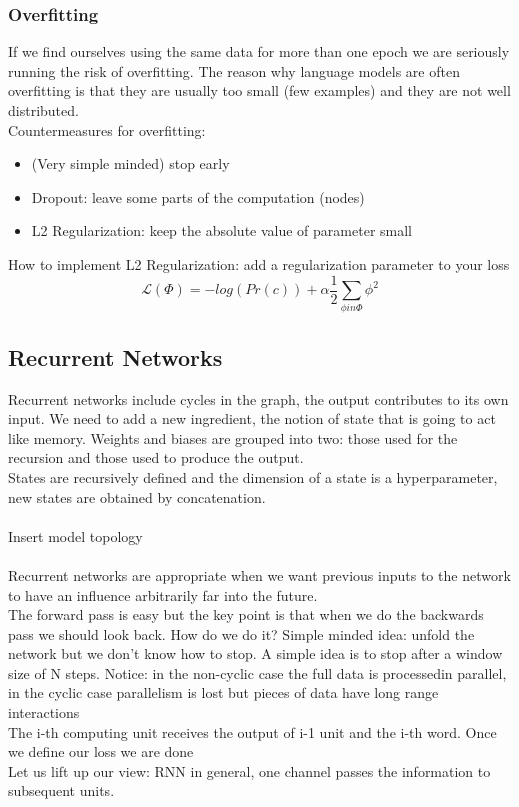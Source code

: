 \subsubsection*{Overfitting}
If we find ourselves using the same data for more than one epoch we are seriously running the risk of overfitting. The reason why language models are often overfitting is that they are usually too small (few examples) and they are not well distributed.\\
Countermeasures for overfitting:
\begin{itemize}
   \item (Very simple minded) stop early
   \item Dropout: leave some parts of the computation (nodes)
   \item L2 Regularization: keep the absolute value of parameter small
\end{itemize}
How to implement L2 Regularization: add a regularization parameter to your loss 
\[ 
   \mathcal{L}(\Phi) = -log(Pr(c)) + \alpha \frac{1}{2}\sum_{\phi in \Phi}{\phi^2} 
\]
\subsection{Recurrent Networks}
Recurrent networks include cycles in the graph, the output contributes to its own input. We need to add a new ingredient, the notion of state that is going to act like memory. Weights and biases are grouped into two: those used for the recursion and those used to produce the output.\\
States are recursively defined and the dimension of a state is a hyperparameter, new states are obtained by concatenation.\\\\
Insert model topology\\\\
Recurrent networks are appropriate when we want previous inputs to the network to have an influence arbitrarily far into the future.\\ The forward pass is easy but the key point is that when we do the backwards pass we should look back. How do we do it? Simple minded idea: unfold the network but we don't know how to stop. A simple idea is to stop after a window size of N steps. Notice: in the non-cyclic case the full data is processedin parallel, in the cyclic case parallelism is lost but pieces of data have long range interactions\\ The i-th computing unit receives the output of i-1 unit and the i-th word. Once we define our loss we are done\\
Let us lift up our view: RNN in general, one channel passes the information to subsequent units.
